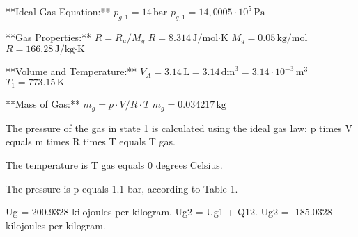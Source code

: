 **Ideal Gas Equation:**  
\( p_{g,1} = 14 \, \text{bar} \)  
\( p_{g,1} = 14,0005 \cdot 10^5 \, \text{Pa} \)  

**Gas Properties:**  
\( R = R_u / M_g \)  
\( R = 8.314 \, \text{J/mol·K} \)  
\( M_g = 0.05 \, \text{kg/mol} \)  
\( R = 166.28 \, \text{J/kg·K} \)  

**Volume and Temperature:**  
\( V_A = 3.14 \, \text{L} = 3.14 \, \text{dm}^3 = 3.14 \cdot 10^{-3} \, \text{m}^3 \)  
\( T_1 = 773.15 \, \text{K} \)  

**Mass of Gas:**  
\( m_g = p \cdot V / R \cdot T \)  
\( m_g = 0.034217 \, \text{kg} \)

The pressure of the gas in state 1 is calculated using the ideal gas law:  
p times V equals m times R times T equals T gas.  

The temperature is T gas equals 0 degrees Celsius.  

The pressure is p equals 1.1 bar, according to Table 1.

Ug = 200.9328 kilojoules per kilogram.  
Ug2 = Ug1 + Q12.  
Ug2 = -185.0328 kilojoules per kilogram.